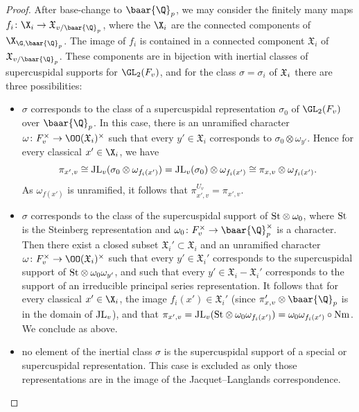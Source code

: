 \begin{proof}
 After base-change to $\baar{\Q}_{p}$, we may consider the  finitely many maps $f_{i}\colon \X_{i}\to \mathfrak{X}_{v/\baar{\Q}_{p}}$, where the $\X_{i}$ are the connected components of $\X_{\G,\baar{\Q}_{p}}$. The image of  $f_{i}$ is contained in a connected component $\mathfrak{X}_{i}$ of  $\mathfrak{X}_{v/\baar{\Q}_{p}}$. These components are in bijection with inertial classes of supercuspidal supports for $\GL_{2}(F_{v})$, and  for the class $\sigma=\sigma_i $ of $\frak X_i$ there are three possibilities:
\begin{itemize}
\item $\sigma$ corresponds to  the class of a  supercuspidal representation  $\sigma_0$ of $\GL_{2}(F_{v})$ over $\baar{\Q}_{p}$. In this case, there is an unramified character $\omega\colon F_{v}^{\times}\to \OO(\frak{X}_i)^{\times}$ such that every $y'\in \mathfrak{X}_{i}$ corresponds to $\sigma_0\otimes\omega_{y'}$. Hence for  every classical  $x'\in  \X_{i}$, we have $$\pi_{x',v}\cong {\rm JL}_{v}( \sigma_0\otimes\omega_{f_{i}(x')})={\rm JL}_{v}( \sigma_0)\otimes\omega_{f_{i}(x')}\cong \pi_{x,v}\otimes \omega_{f_{i}(x')}.$$
 As $\omega_{f(x')}$ is unramified, it follows that  $\pi_{x',v}^{U_{v}}=\pi_{x',v}$.
\item $\sigma$ corresponds to the class of the supercuspidal support of ${\rm St}\otimes\omega_{0}$, where ${\rm St}$ is the Steinberg representation and $\omega_{0}\colon F_{v}^{\times}\to \baar{\Q}_{p}^{\times}$ is a character. Then there exist a closed subset $\mathfrak{X}_{i}'\subset \mathfrak{X}_{i}$ and an unramified character $\omega\colon F_{v}^{\times}\to \OO(\mathfrak{X}_{i})^{\times}$ such that  every $y'\in \mathfrak{X}_{i}'$ corresponds to the supercuspidal support of ${\rm St} \otimes\omega_{0}\omega_{y'}$, and such that every $y'\in \mathfrak{X}_{i}-\mathfrak{X}_{i}'$ corresponds to the support of an irreducible principal series representation. It follows that for  every classical $x'\in \X_{i}$,  the image $f_{i}(x')\in \mathfrak{X}_{i}'$ (since $\pi_{x,v}'\otimes \baar{\Q}_{p}$ is in the domain of ${\rm JL}_{v}$),  and that $\pi_{x',v} ={\rm JL}_{v}({\rm St}\otimes\omega_{0}\omega_{f_{i}(x')})=\omega_{0}\omega_{f_{i}(x')}\circ {\rm Nm}$. We conclude as above.

\item no element of the inertial class $\sigma$ is the supercuspidal support of a special or supercuspidal representation. This case is excluded as only those representations are in the image of the Jacquet--Langlands correspondence.
\end{itemize}
\end{proof}


